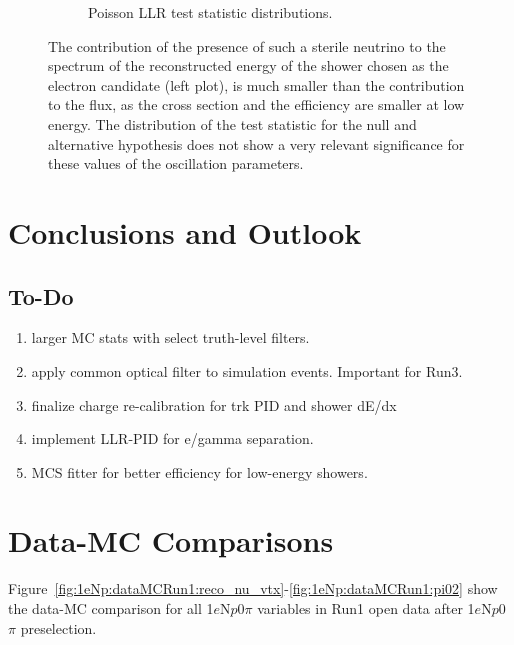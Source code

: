 \documentclass[a4paper]{article}
\newcommand{\npsel}{1$e$N$p$0$\pi$ }
\begin{document}
\begin{figure}[ht]
\begin{center}
\begin{subfigure}[b]{0.45\textwidth}
    \caption{Poisson LLR test statistic distributions.}
    \end{subfigure}
\caption{The contribution of the presence of such a sterile neutrino to the spectrum of the reconstructed energy of the shower chosen as the electron candidate (left plot), is much smaller than the contribution to the flux, as the cross section and the efficiency are smaller at low energy.
The distribution of the test statistic for the null and alternative hypothesis does not show a very relevant significance for these values of the oscillation parameters.}
\label{fig:oscillation_sensitivity}
\end{center}
\end{figure}




\newpage
\section{Conclusions and Outlook}

\subsection{To-Do}
\begin{enumerate}
    \item larger MC stats with select truth-level filters.
    \item apply common optical filter to simulation events. Important for Run3.
    \item finalize charge re-calibration for trk PID and shower dE/dx
    \item implement LLR-PID for e/gamma separation.
    \item MCS fitter for better efficiency for low-energy showers.

\end{enumerate}{}

\newpage

\appendix

\section{Data-MC Comparisons}
\label{sec:datamc:plots}

Figure~\ref{fig:1eNp:dataMCRun1:reco_nu_vtx}-\ref{fig:1eNp:dataMCRun1:pi02} show the data-MC comparison for all \npsel variables in Run1 open data after \npsel preselection.
\end{document}
